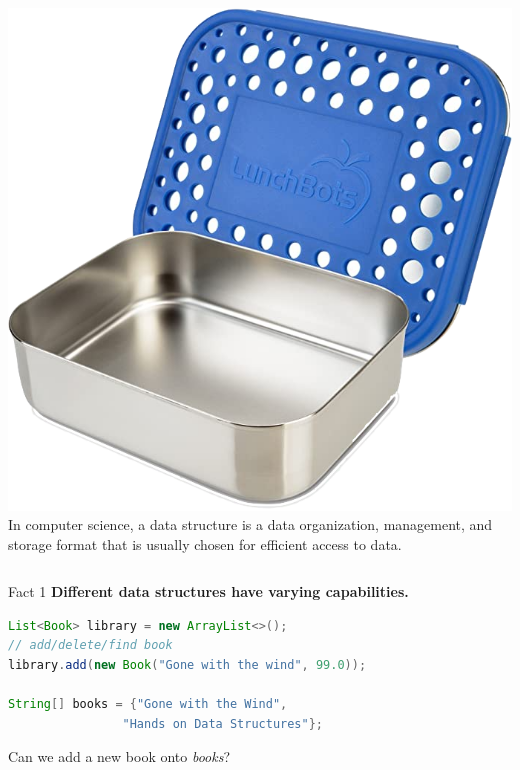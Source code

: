\documentclass[aspectratio=169, 14pt]{beamer}
\begin{document}
\begin{frame}[fragile]
\begin{columns}
		\includegraphics[height=.4\paperheight]{week0/box2}
		\pause
		In computer science, a data structure is a data \alert{organization, management, and storage} format that is usually chosen for \alert{efficient} access to data.
	\end{columns}

\end{frame}

\begin{frame}[fragile]
	\begin{block}{Fact 1}
		\textbf{Different data structures have varying \alert{capabilities}.}
	\end{block}

	\begin{lstlisting}[language=Java]
List<Book> library = new ArrayList<>();
// add/delete/find book
library.add(new Book("Gone with the wind", 99.0));

String[] books = {"Gone with the Wind", 
                "Hands on Data Structures"};    
\end{lstlisting}

	{\large {}} Can we add a new book onto \emph{books}?
	\pause

\end{frame}
\end{document}
